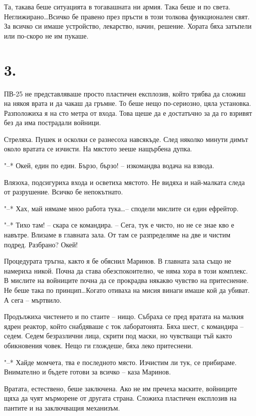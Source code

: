 \documentclass[ebook,openany,12pt]{memoir}
\begin{document}
Та, такава беше ситуацията в тогавашната ни армия. Така беше и по света. Неглижирано\ldots Всичко бе правено през пръсти в този толкова функционален свят. За всичко си имаше устройство, лекарство, начин, решение. Хората бяха затъпели или по-скоро не им пукаше.

\section*{3.}

ПВ-25 не представляваше просто пластичен експлозив, който трябва да сложиш на някоя врата и да чакаш да гръмне. То беше нещо по-сериозно, цяла установка. Разположиха я на сто метра от входа. Това щеше да е достатъчно за да го взривят без да има пострадали войници. 

Стреляха. Пушек и осколки се разнесоха навсякъде. След няколко минути димът около вратата се изчисти. На мястото зееше нащърбена дупка.

"--* Окей, един по един. Бързо, бързо! – изкомандва водача на взвода.

Влязоха, подсигуриха входа и осветиха мястото. Не видяха и най-малката следа от разрушение. Всичко бе непокътнато.

"--* Хах, май нямаме мноо работа тука\ldots – сподели мислите си един ефрейтор.

"--* Тихо там! – скара се командира. – Сега, тук е чисто, но не се знае кво е навътре. Влизаме в главната зала. От там се разпределяме на две и чистим подред. Разбрано? Окей!

Процедурата тръгна, както я бе обяснил Маринов. В главната зала също не намериха никой. Почна да става обезспокоително, че няма хора в този комплекс. В мислите на войниците почна да се прокрадва някакво чувство на притеснение. Не беше така по принцип\ldots Когато отиваха на мисия винаги имаше кой да убиват. А сега – мъртвило.

Продължиха чистенето и по стаите – нищо. Събраха се пред вратата на малкия ядрен реактор, който снабдяваше с ток лаборатоията. Бяха шест, с командира – седем. Седем безразлични лица, скрити под маски, но чувстващи тъй както обикновения човек. Нещо ги глождеше, бяха леко притеснени.

"--* Хайде момчета, тва е последното място. Изчистим ли тук, се прибираме. Внимателно и бъдете готови за всичко – каза Маринов.

Вратата, естествено, беше заключена. Ако не им пречеха маските, войниците щяха да чуят мърморене от другата страна. Сложиха пластичен експлозив на пантите и на заключващия механизъм.
\end{document}

